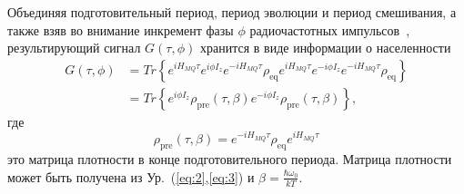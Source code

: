 \documentclass[preprint,12pt]{elsarticle}
\begin{document}
Объединяя подготовительный период, период эволюции и период смешивания, 
а также взяв во внимание инкремент фазы $\phi$ радиочастотных импульсов~\cite{10}, 
результирующий сигнал $G(\tau,\phi)$ хранится в виде информации о населенности
%
\begin{equation} \label{eq:4}
	\begin{split}
		G(\tau,\phi)
		& = Tr \left\{
			e^{iH_{MQ}\tau} e^{i\phi I_z} e^{-iH_{MQ}\tau} \rho_\mathrm{eq}
			e^{iH_{MQ}\tau} e^{-i\phi I_z} e^{-iH_{MQ}\tau}\rho_\mathrm{eq}
		\right\}
		\\
		& = Tr \left\{
			e^{i\phi I_z} \rho_\mathrm{pre}(\tau,\beta)
      e^{-i\phi I_z}\rho_\mathrm{pre}(\tau,\beta)
		\right\},
	\end{split}
\end{equation}
%
где
%
\begin{equation} \label{eq:5}
	\rho_\mathrm{pre}(\tau,\beta) = e^{-iH_{MQ}\tau}\rho_\mathrm{eq}e^{iH_{MQ}\tau}
\end{equation}
%
это матрица плотности в конце подготовительного периода. 
Матрица плотности может быть получена из Ур.~(\ref{eq:2},\ref{eq:3}) и $\beta = \frac{\hbar \omega_0}{kT}$.
\end{document}
